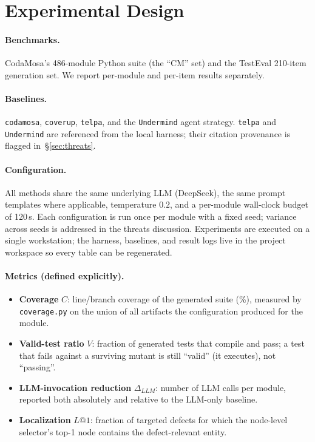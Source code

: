 \documentclass[11pt]{article}
\begin{document}
\section{Experimental Design}
\paragraph{Benchmarks.} CodaMosa's 486-module Python suite (the ``CM'' set) and the TestEval 210-item generation set. We report per-module and per-item results separately.
\paragraph{Baselines.} \texttt{codamosa}, \texttt{coverup}, \texttt{telpa}, and the \texttt{Undermind} agent strategy. \texttt{telpa} and \texttt{Undermind} are referenced from the local harness; their citation provenance is flagged in~\S\ref{sec:threats}.
\paragraph{Configuration.} All methods share the same underlying LLM (DeepSeek), the same prompt templates where applicable, temperature $0.2$, and a per-module wall-clock budget of 120\,s. Each configuration is run once per module with a fixed seed; variance across seeds is addressed in the threats discussion. Experiments are executed on a single workstation; the harness, baselines, and result logs live in the project workspace so every table can be regenerated.

\paragraph{Metrics (defined explicitly).}
\begin{itemize}
  \item \textbf{Coverage} $C$: line/branch coverage of the generated suite (\%), measured by \texttt{coverage.py} on the union of all artifacts the configuration produced for the module.
  \item \textbf{Valid-test ratio} $V$: fraction of generated tests that compile and pass; a test that fails against a surviving mutant is still ``valid'' (it executes), not ``passing''.
  \item \textbf{LLM-invocation reduction} $\Delta_{LLM}$: number of LLM calls per module, reported both absolutely and relative to the LLM-only baseline.
  \item \textbf{Localization} $L@1$: fraction of targeted defects for which the node-level selector's top-1 node contains the defect-relevant entity.
\end{itemize}
\end{document}
